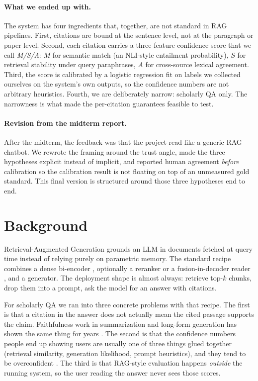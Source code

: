 \documentclass[10pt]{article}
\begin{document}
\paragraph{What we ended up with.}
The system has four ingredients that, together, are not standard in
RAG pipelines. First, citations are bound at the sentence level, not
at the paragraph or paper level. Second, each citation carries a
three-feature confidence score that we call \emph{M/S/A}: $M$ for
semantic match (an NLI-style entailment probability), $S$ for
retrieval stability under query paraphrases, $A$ for cross-source
lexical agreement. Third, the score is calibrated by a logistic
regression fit on labels we collected ourselves on the system's own
outputs, so the confidence numbers are not arbitrary heuristics.
Fourth, we are deliberately narrow: scholarly QA only. The narrowness
is what made the per-citation guarantees feasible to test.

\paragraph{Revision from the midterm report.}
After the midterm, the feedback was that the project read like a
generic RAG chatbot. We rewrote the framing around the trust angle,
made the three hypotheses explicit instead of implicit, and reported
human agreement \emph{before} calibration so the calibration result
is not floating on top of an unmeasured gold standard. This final
version is structured around those three hypotheses end to end.

\section{Background}
\label{sec:background}

Retrieval-Augmented Generation \citep{lewis2020rag} grounds an LLM in
documents fetched at query time instead of relying purely on
parametric memory. The standard recipe combines a dense bi-encoder
\citep{karpukhin2020dpr}, optionally a reranker
\citep{khattab2020colbert} or a fusion-in-decoder reader
\citep{izacard2021leveraging}, and a generator. The deployment shape
is almost always: retrieve top-$k$ chunks, drop them into a prompt,
ask the model for an answer with citations.

For scholarly QA we ran into three concrete problems with that
recipe. The first is that a citation in the answer does not actually
mean the cited passage supports the claim. Faithfulness work in
summarization and long-form generation has shown the same thing for
years \citep{maynez2020faithfulness, min2023factscore,
rashkin2023attribution}. The second is that the confidence numbers
people end up showing users are usually one of three things glued
together (retrieval similarity, generation likelihood, prompt
heuristics), and they tend to be overconfident
\citep{guo2017calibration, mahaut2024factual}. The third is that
RAG-style evaluation \citep{es2024ragas, zheng2023judging} happens
\emph{outside} the running system, so the user reading the answer
never sees those scores.
\end{document}
